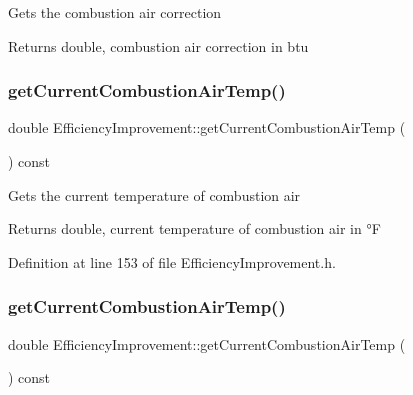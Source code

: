 Gets the combustion air correction

\begin{DoxyReturn}{Returns}
double, combustion air correction in btu 
\end{DoxyReturn}
\mbox{\label{class_efficiency_improvement_aa2f9d297f3c31e249c7a8035fd5602f1}} 
\subsubsection{\texorpdfstring{get\+Current\+Combustion\+Air\+Temp()}{getCurrentCombustionAirTemp()}\hspace{0.1cm}{\footnotesize\ttfamily [1/3]}}
{\footnotesize\ttfamily double Efficiency\+Improvement\+::get\+Current\+Combustion\+Air\+Temp (\begin{DoxyParamCaption}{ }\end{DoxyParamCaption}) const\hspace{0.3cm}{\ttfamily [inline]}}

Gets the current temperature of combustion air

\begin{DoxyReturn}{Returns}
double, current temperature of combustion air in °F 
\end{DoxyReturn}


Definition at line 153 of file Efficiency\+Improvement.\+h.

\mbox{\label{class_efficiency_improvement_aa2f9d297f3c31e249c7a8035fd5602f1}} 
\subsubsection{\texorpdfstring{get\+Current\+Combustion\+Air\+Temp()}{getCurrentCombustionAirTemp()}\hspace{0.1cm}{\footnotesize\ttfamily [2/3]}}
{\footnotesize\ttfamily double Efficiency\+Improvement\+::get\+Current\+Combustion\+Air\+Temp (\begin{DoxyParamCaption}{ }\end{DoxyParamCaption}) const\hspace{0.3cm}{\ttfamily [inline]}}


